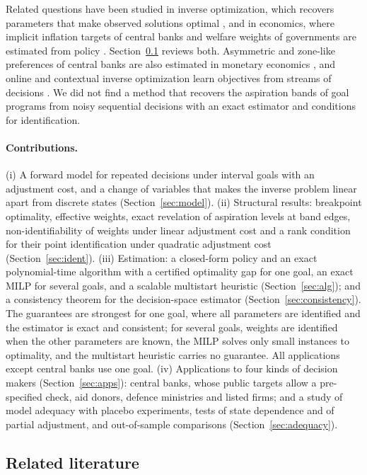 \documentclass[11pt,a4paper]{article}
\theoremstyle{remark}\newtheorem{remark}{Remark}
\begin{document}
Related questions have been studied in inverse optimization, which recovers parameters that make observed solutions optimal \citep{ahuja2001,chan2025review}, and in economics, where implicit inflation targets of central banks and welfare weights of governments are estimated from policy \citep{dennis2006,hendren2020}. Section~\ref{sec:lit} reviews both. Asymmetric and zone-like preferences of central banks are also estimated in monetary economics \citep{orphanides2002,rugemurcia2003,kilian2008}, and online and contextual inverse optimization learn objectives from streams of decisions \citep{besbes2025}. We did not find a method that recovers the aspiration bands of goal programs from noisy sequential decisions with an exact estimator and conditions for identification.

\paragraph{Contributions.} (i) A forward model for repeated decisions under interval goals with an adjustment cost, and a change of variables that makes the inverse problem linear apart from discrete states (Section~\ref{sec:model}). (ii) Structural results: breakpoint optimality, effective weights, exact revelation of aspiration levels at band edges, non-identifiability of weights under linear adjustment cost and a rank condition for their point identification under quadratic adjustment cost (Section~\ref{sec:ident}). (iii) Estimation: a closed-form policy and an exact polynomial-time algorithm with a certified optimality gap for one goal, an exact MILP for several goals, and a scalable multistart heuristic (Section~\ref{sec:alg}); and a consistency theorem for the decision-space estimator (Section~\ref{sec:consistency}). The guarantees are strongest for one goal, where all parameters are identified and the estimator is exact and consistent; for several goals, weights are identified when the other parameters are known, the MILP solves only small instances to optimality, and the multistart heuristic carries no guarantee. All applications except central banks use one goal. (iv) Applications to four kinds of decision makers (Section~\ref{sec:apps}): central banks, whose public targets allow a pre-specified check, aid donors, defence ministries and listed firms; and a study of model adequacy with placebo experiments, tests of state dependence and of partial adjustment, and out-of-sample comparisons (Section~\ref{sec:adequacy}).

\subsection{Related literature}\label{sec:lit}
\end{document}
